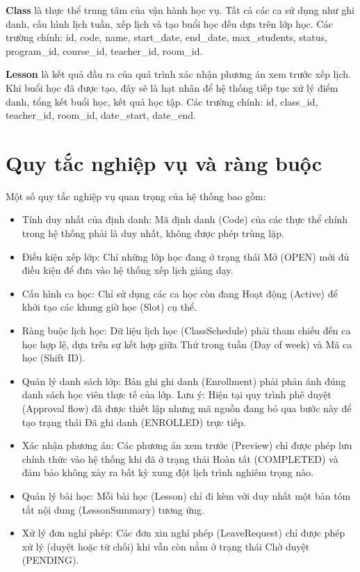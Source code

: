 \documentclass[../DoAn.tex]{subfiles}
\begin{document}
\textbf{Class} là thực thể trung tâm của vận hành học vụ. Tất cả các ca sử dụng như ghi danh, cấu hình lịch tuần, xếp lịch và tạo buổi học đều dựa trên lớp học. Các trường chính: id, code, name, start\_date, end\_date, max\_students, status, program\_id, course\_id, teacher\_id, room\_id.

\textbf{Lesson} là kết quả đầu ra của quá trình xác nhận phương án xem trước xếp lịch. Khi buổi học đã được tạo, đây sẽ là hạt nhân để hệ thống tiếp tục xử lý điểm danh, tổng kết buổi học, kết quả học tập. Các trường chính: id, class\_id, teacher\_id, room\_id, date\_start, date\_end.

\section{Quy tắc nghiệp vụ và ràng buộc}
\label{section:2.7}

Một số quy tắc nghiệp vụ quan trọng của hệ thống bao gồm:
\begin{itemize}
    \item Tính duy nhất của định danh: Mã định danh (Code) của các thực thể chính trong hệ thống phải là duy nhất, không được phép trùng lặp.
    \item Điều kiện xếp lớp: Chỉ những lớp học đang ở trạng thái Mở (OPEN) mới đủ điều kiện để đưa vào hệ thống xếp lịch giảng dạy.

    \item Cấu hình ca học: Chỉ sử dụng các ca học còn đang Hoạt động (Active) để khởi tạo các khung giờ học (Slot) cụ thể.

    \item Ràng buộc lịch học: Dữ liệu lịch học (ClassSchedule) phải tham chiếu đến ca học hợp lệ, dựa trên sự kết hợp giữa Thứ trong tuần (Day of week) và Mã ca học (Shift ID).

    \item Quản lý danh sách lớp: Bản ghi ghi danh (Enrollment) phải phản ánh đúng danh sách học viên thực tế của lớp.
    Lưu ý: Hiện tại quy trình phê duyệt (Approval flow) đã được thiết lập nhưng mã nguồn đang bỏ qua bước này để tạo trạng thái Đã ghi danh (ENROLLED) trực tiếp.

    \item Xác nhận phương án: Các phương án xem trước (Preview) chỉ được phép lưu chính thức vào hệ thống khi đã ở trạng thái Hoàn tất (COMPLETED) và đảm bảo không xảy ra bất kỳ xung đột lịch trình nghiêm trọng nào.

    \item Quản lý bài học: Mỗi bài học (Lesson) chỉ đi kèm với duy nhất một bản tóm tắt nội dung (LessonSummary) tương ứng.

    \item Xử lý đơn nghỉ phép: Các đơn xin nghỉ phép (LeaveRequest) chỉ được phép xử lý (duyệt hoặc từ chối) khi vẫn còn nằm ở trạng thái Chờ duyệt (PENDING).

\end{itemize}
\end{document}
